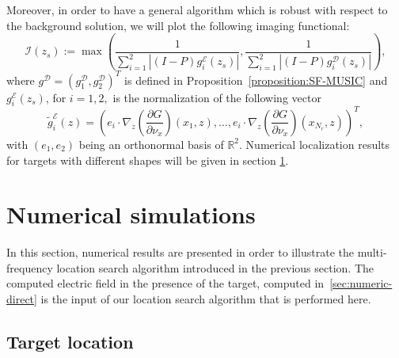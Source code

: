 \cqfd

Moreover, in order to have a general algorithm which is robust
with respect to the background solution, we will plot the
following imaging functional:
\begin{equation} \label{musicf}
\mathcal{I}(z_{s}):=\max\left(\frac{1}{ \sum_{i=1}^2
\left|(I-P)g_i^{\mathcal{E}}(z_{s})\right|}, \frac{1}{\sum_{i=1}^2
\left|(I-P)g_i^{\mathcal{D}}(z_{s})\right|}\right),
\end{equation}
where $g^{\mathcal{D}} =(g_1^{\mathcal{D}}, g_2^{\mathcal{D}})^T$
is defined in Proposition~\ref{proposition:SF-MUSIC} and
$g_i^{\mathcal{E}}(z_{s})$, for $i=1,2,$ is the normalization of
the following vector
\[
\tilde{g}_i^{\mathcal{E}}(z)=\left( e_i \cdot
\nabla_{z}\left(\frac{\partial
G}{\partial\nu_{x}}\right)(x_{1},z),\ldots, e_i \cdot
\nabla_{z}\left(\frac{\partial
G}{\partial\nu_{x}}\right)(x_{N_r},z)\right)^{T},
\]
with $(e_1,e_2)$ being an orthonormal  basis of $\mathbb{R}^{2}$.
Numerical localization results for targets with different shapes
will be given in section \ref{sec:numeric}.



\section{Numerical simulations}

\label{sec:numeric}

In this section, numerical results are presented in order to
illustrate the multi-frequency location search algorithm
introduced in the previous section. The computed electric field in
the presence of the target, computed in~\ref{sec:numeric-direct}
is the input of our location search algorithm that is performed here.

\subsection{Target location}

